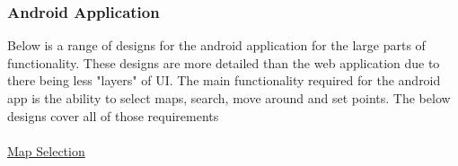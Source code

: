 \pagebreak
\subsubsection{Android Application}
Below is a range of designs for the android application for the large parts of functionality. These designs are more detailed than the web application due to there being less "layers" of UI. The main functionality required for the android app is the ability to select maps, search, move around and set points. The below designs cover all of those requirements \\
\\\underline{Map Selection}
\begin{center}

\end{center}
